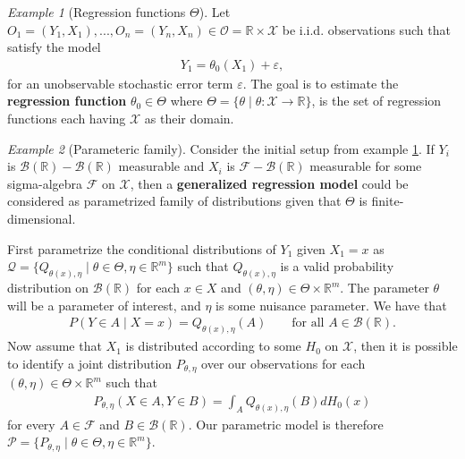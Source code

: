 \documentclass[11pt, a4paper]{article}
\theoremstyle{definition}
\theoremstyle{remark}
\newtheorem{example}{Example}
\begin{document}
\begin{example}[Regression functions $ \Theta $] \label{ex:regfunc}
    Let $ O_1 = (Y_1 , X_1) ,..., O_n = (Y_n , X_n) \in  \mathcal{O} = \mathbb{R} \times \mathcal{X} $ be i.i.d. observations such that satisfy the model 
    \begin{align*}
        Y_1 = \theta_0(X_1) + \varepsilon,
    \end{align*}
    for an unobservable stochastic error term $ \varepsilon $. The goal is to estimate the \textbf{regression function} $ \theta_0 \in \Theta $ where $ \Theta = \{\theta \mid \theta : \mathcal{X} \to \mathbb{R}\}$, is the set of regression functions each having $ \mathcal{X} $ as their domain. \cite{vaart06}
\end{example}
\begin{example}[Parameteric family] \label{ex:parametricfam}
    Consider the initial setup from example \ref{ex:regfunc}. If $ Y_i $ is $ \mathcal{B}(\mathbb{R})-\mathcal{B}(\mathbb{R}) $ measurable and $ X_i $ is $ \mathcal{F} - \mathcal{B}(\mathbb{R})  $ measurable for some sigma-algebra $ \mathcal{F} $ on $ \mathcal{X} $, then a \textbf{generalized regression model} could be considered as parametrized family of distributions given that $ \Theta $ is finite-dimensional.

    First parametrize the conditional distributions of $ Y_1 $ given $ X_1 = x $ as $ \mathcal{Q} = \{Q_{\theta(x), \eta} \mid \theta \in \Theta , \eta \in \mathbb{R}^{m} \} $ such that $ Q_{\theta(x), \eta} $ is a valid probability distribution on $ \mathcal{B}(\mathbb{R}) $ for each $ x \in X $ and $ (\theta,\eta) \in \Theta \times \mathbb{R}^{m} $. The parameter $ \theta $ will be a parameter of interest, and $ \eta $ is some nuisance parameter. We have that 
    \begin{align*}
        P(Y \in A \mid X = x) = Q_{ \theta(x), \eta}(A) \qquad \text{for all } A \in \mathcal{B}(\mathbb{R}).
    \end{align*}
    Now assume that $ X_1 $ is distributed according to some $ H_0 $ on $ \mathcal{X} $, then it is possible to identify a joint distribution $ P_{\theta , \eta} $ over our observations for each $ (\theta , \eta) \in \Theta \times \mathbb{R}^{m} $ such that 
    \begin{align*}
        P_{\theta , \eta }(X \in A, Y \in B ) = \int_{A} Q_{\theta(x), \eta}(B) d H_{0}(x) 
    \end{align*}
    for every $ A \in \mathcal{F} $ and $ B \in \mathcal{B}(\mathbb{R}) $. Our parametric model is therefore $ \mathcal{P} = \{P_{\theta , \eta} \mid \theta \in \Theta , \eta \in \mathbb{R}^{m}\} $. \cite{bickel1993efficient}
\end{example}
\end{document}
